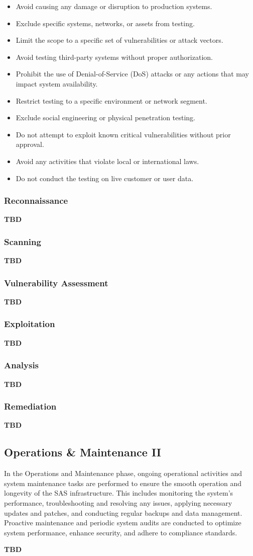 \begin{itemize}
    \item Avoid causing any damage or disruption to production systems.
    \item Exclude specific systems, networks, or assets from testing.
    \item Limit the scope to a specific set of vulnerabilities or attack vectors.
    \item Avoid testing third-party systems without proper authorization.
    \item Prohibit the use of Denial-of-Service (DoS) attacks or any actions that may impact system availability.
    \item Restrict testing to a specific environment or network segment.
    \item Exclude social engineering or physical penetration testing.
    \item Do not attempt to exploit known critical vulnerabilities without prior approval.
    \item Avoid any activities that violate local or international laws.
    \item Do not conduct the testing on live customer or user data.
\end{itemize}

\subsubsection{Reconnaissance}
\textbf{TBD}
\subsubsection{Scanning}
\textbf{TBD}
\subsubsection{Vulnerability Assessment}
\textbf{TBD}
\subsubsection{Exploitation}
\textbf{TBD}
\subsubsection{Analysis}
\textbf{TBD}
\subsubsection{Remediation}
\textbf{TBD}

\subsection{Operations \& Maintenance II}
In the Operations and Maintenance phase, ongoing operational activities and system maintenance tasks are performed to ensure the smooth operation and longevity of the SAS infrastructure. This includes monitoring the system's performance, troubleshooting and resolving any issues, applying necessary updates and patches, and conducting regular backups and data management. Proactive maintenance and periodic system audits are conducted to optimize system performance, enhance security, and adhere to compliance standards.

\textbf{TBD}